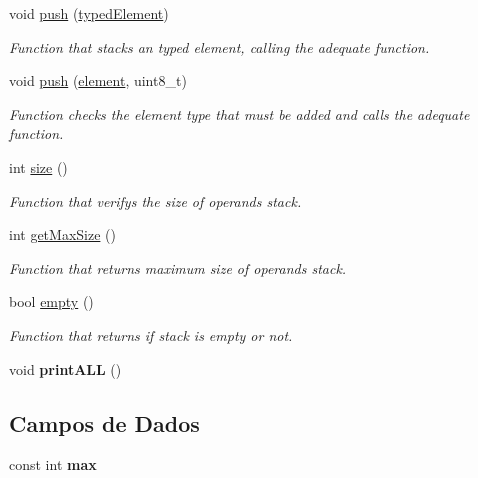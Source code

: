\begin{DoxyCompactItemize}
void \hyperlink{classPilhaOperandos_a2a8591e6f42cee7186ee70e0fa998208}{push} (\hyperlink{structtypedElement__s}{typed\+Element})
\begin{DoxyCompactList}\small\item\em Function that stacks an typed element, calling the adequate function. \end{DoxyCompactList}\item 
void \hyperlink{classPilhaOperandos_a7879a301351feee2cd4bbd7639e44822}{push} (\hyperlink{unionelement__u}{element}, uint8\+\_\+t)
\begin{DoxyCompactList}\small\item\em Function checks the element type that must be added and calls the adequate function. \end{DoxyCompactList}\item 
\mbox{\label{classPilhaOperandos_a3db3fb4dd085cd2f7454a92e93b7ad3c}} 
int \hyperlink{classPilhaOperandos_a3db3fb4dd085cd2f7454a92e93b7ad3c}{size} ()
\begin{DoxyCompactList}\small\item\em Function that verifys the size of operands stack. \end{DoxyCompactList}\item 
\mbox{\label{classPilhaOperandos_a6de0f5994b22c1c0b3d903e233bbf6fe}} 
int \hyperlink{classPilhaOperandos_a6de0f5994b22c1c0b3d903e233bbf6fe}{get\+Max\+Size} ()
\begin{DoxyCompactList}\small\item\em Function that returns maximum size of operands stack. \end{DoxyCompactList}\item 
\mbox{\label{classPilhaOperandos_a4099bf8202558794b12086c410da3e16}} 
bool \hyperlink{classPilhaOperandos_a4099bf8202558794b12086c410da3e16}{empty} ()
\begin{DoxyCompactList}\small\item\em Function that returns if stack is empty or not. \end{DoxyCompactList}\item 
\mbox{\label{classPilhaOperandos_ab0f7d8632714842751483b7463e34efb}} 
void {\bfseries print\+A\+LL} ()
\end{DoxyCompactItemize}
\subsection*{Campos de Dados}
\begin{DoxyCompactItemize}
\item 
\mbox{\label{classPilhaOperandos_a010c46a6b2a726067e823fa5488414af}} 
const int {\bfseries max}
\end{DoxyCompactItemize}


